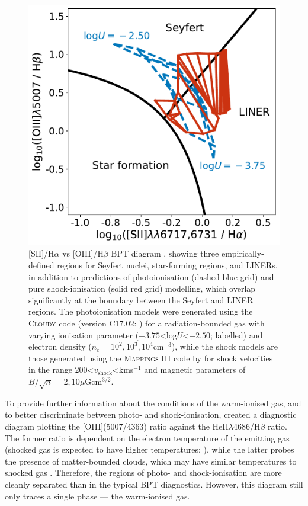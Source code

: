 \begin{figure}
    \centering
    \includegraphics[width=0.75\linewidth]{figures/introduction/bpt_diagram_photo_shock_ionisation.pdf}
    \caption[{[SII]/H$\alpha$ vs [OIII]/H$\beta$ BPT \citep{Baldwin1981, Kewley2006} diagram with shock and photoionisation modelling.}]{[SII]/H$\alpha$ vs [OIII]/H$\beta$ BPT diagram \citep{Baldwin1981}, showing three empirically-defined regions \citep{Kewley2006} for Seyfert nuclei, star-forming regions, and LINERs, in addition to predictions of photoionisation (dashed blue grid) and pure shock-ionisation (solid red grid) modelling, which overlap significantly at the boundary between the Seyfert and LINER regions. The photoionisation models were generated using the \textsc{Cloudy} code (version C17.02: \citealt{Ferland2017}) for a radiation-bounded gas with varying ionisation parameter ($-3.75$\;\textless\;log$U$\;\textless\;$-2.50$; labelled) and electron density ($n_e=10^2,10^3,10^4$\;cm$^{-3}$), while the shock models are those generated using the \textsc{Mappings III} code by \citet{Allen2008} for shock velocities in the range 200\;\textless\;$v_\mathrm{shock}$\;\textless{}\;km\;s$^{-1}$ and magnetic parameters of $B/\sqrt{n}=2,10$\;$\mu$G\;cm$^{3/2}$.}
    \label{fig: introduction: outflows: acceleration_mechanisms: bpt_diagram_photo_shock_ionisation}
\end{figure}

To provide further information about the conditions of the warm-ionised gas, and to better discriminate between photo- and shock-ionisation, \citet{VillarMartin1999} created a diagnostic diagram plotting the [OIII](5007/4363) ratio against the He\;II$\lambda$4686/H$\beta$ ratio. The former ratio is dependent on the electron temperature of the emitting gas (shocked gas is expected to have higher temperatures: \citealt{Fosbury1978}), while the latter probes the presence of matter-bounded clouds, which may have similar temperatures to shocked gas \citep{Binette1996}. Therefore, the regions of photo- and shock-ionisation are more cleanly separated than in the typical BPT diagnostics. However, this diagram still only traces a single phase --- the warm-ionised gas.

